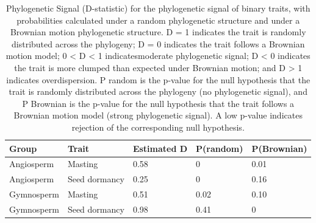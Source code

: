 \documentclass{article}
\begin{document}
\begin{table}[ht]
\centering

\begin{tabular}{lllll}
  \hline
Group & Trait & Estimated D & P(random) & P(Brownian) \\ 
  \hline
Angiosperm & Masting & 0.58 & 0 & 0.01 \\ 
  Angiosperm & Seed dormancy & 0.25 & 0 & 0.16 \\ 
  Gymnosperm & Masting & 0.51 & 0.02 & 0.10 \\ 
  Gymnosperm & Seed dormancy & 0.98 & 0.41 & 0 \\ 
   \hline
\end{tabular}
\caption{Phylogenetic Signal (D-statistic) for the phylogenetic signal of binary traits, with probabilities calculated under a random phylogenetic structure and under a Brownian motion phylogenetic structure. D = 1 indicates the trait is randomly distributed across the phylogeny; D = 0 indicates the trait follows a Brownian motion model; 0 < D < 1 indicatesmoderate phylogenetic signal; D < 0 indicates the trait is more clumped than expected under Brownian motion; and D > 1 indicates overdispersion. P random is the p-value for the null hypothesis that the trait is randomly distributed across the phylogeny (no phylogenetic signal), and P Brownian is the p-value for the null hypothesis that the trait follows a Brownian motion model (strong phylogenetic signal). A low p-value indicates rejection of the corresponding null hypothesis.}
\label{tab:dstat}
\end{table}
\end{document}
